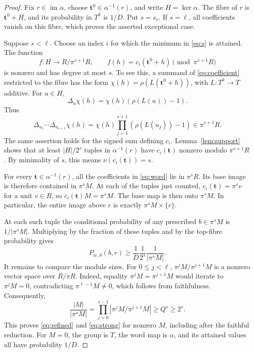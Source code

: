 \documentclass[11pt]{article}
\theoremstyle{remark}\newtheorem{remark}[theorem]{Remark}
\newcommand{\im}{\operatorname{im}}
\begin{document}
\begin{proof}
Fix $r\in\im\alpha$, choose $\mathbf t^0\in\alpha^{-1}(r)$, and write $H=\ker\alpha$. The fibre of $r$ is $\mathbf t^0+H$, and its probability in $T^k$ is $1/D$. Put $s=s_r$. If $s=\ell$, all coefficients vanish on this fibre, which proves the asserted exceptional case.

Suppose $s<\ell$. Choose an index $i$ for which the minimum in \eqref{eq:s} is attained. The function
\[
 f:H\longrightarrow R/\pi^{s+1}R,
 \qquad f(h)=c_i(\mathbf t^0+h)\pmod{\pi^{s+1}R}
\]
is nonzero and has degree at most $s$. To see this, a summand of \eqref{eq:coefficient} restricted to the fibre has the form $\chi(h)=\rho(L(\mathbf t^0+h))$, with $L:T^k\to T$ additive. For $u\in H$,
\[
 \Delta_u\chi(h)=\chi(h)(\rho(L(u))-1).
\]
Thus
\[
 \Delta_{u_1}\cdots\Delta_{u_{s+1}}\chi(h)
 =\chi(h)\prod_{j=1}^{s+1}(\rho(L(u_j))-1)
 \in\pi^{s+1}R.
\]
The same assertion holds for the signed sum defining $c_i$. Lemma~\ref{lem:support} shows that at least $|H|/2^s$ tuples in $\alpha^{-1}(r)$ have $c_i(\mathbf t)$ nonzero modulo $\pi^{s+1}R$. By minimality of $s$, this means $\nu(c_i(\mathbf t))=s$.

For every $\mathbf t\in\alpha^{-1}(r)$, all the coefficients in \eqref{eq:word} lie in $\pi^sR$. Its base image is therefore contained in $\pi^sM$. At each of the tuples just counted, $c_i(\mathbf t)=\pi^s v$ for a unit $v\in R$, so $c_i(\mathbf t)M=\pi^sM$. The base map is then onto $\pi^sM$. In particular, the entire image above $r$ is exactly $\pi^sM\times\{r\}$.

At each such tuple the conditional probability of any prescribed $b\in\pi^sM$ is $1/|\pi^sM|$. Multiplying by the fraction of these tuples and by the top-fibre probability gives
\[
 P_{w,S}(b,r)\ge\frac1D\frac1{2^s}\frac1{|\pi^sM|}.
\]
It remains to compare the module sizes. For $0\le j<\ell$,
$\pi^jM/\pi^{j+1}M$ is a nonzero vector space over $R/\pi R$.
Indeed, equality $\pi^jM=\pi^{j+1}M$ would iterate to $\pi^jM=0$,
contradicting $\pi^{\ell-1}M\ne0$, which follows from faithfulness.
Consequently,
\begin{equation}\label{eq:length}
 \frac{|M|}{|\pi^sM|}
 =\prod_{j=0}^{s-1}|\pi^jM/\pi^{j+1}M|\ge Q^s\ge2^s.
\end{equation}
This proves \eqref{eq:refined} and \eqref{eq:strong} for nonzero $M$, including after the faithful reduction. For $M=0$, the group is $T$, the word map is $\alpha$, and its attained values all have probability $1/D$.
\end{proof}
\end{document}
